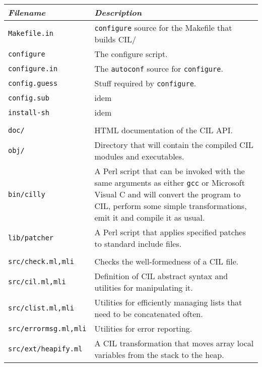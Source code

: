 \documentclass[letterpaper]{article}
\def\t#1{{\tt #1}}
\begin{document}
\begin{longtable}{lp{4in}}
\emph{Filename}   & \emph{Description} \\
\endhead
\endfoot
\t{Makefile.in}                 & \t{configure} source for the 
                                  Makefile that builds CIL/ \\
\t{configure}                   & The configure script. \\
\t{configure.in}                & The \t{autoconf} source for \t{configure}. \\
\t{config.guess} 		& Stuff required by \t{configure}. \\
\t{config.sub} 			& idem \\
\t{install-sh}	 		& idem \\
\\
\t{doc/}                        & HTML documentation of the CIL API. \\
\t{obj/}                        & Directory that will contain the compiled
                                   CIL modules and executables.\\
\t{bin/cilly}                &  A Perl script 
                                  that can be invoked with the 
                                  same arguments as either \t{gcc} or
                                  Microsoft Visual C and will convert the
                                  program to CIL, perform some simple
                                  transformations, emit it and compile it as
                                  usual. \\
\t{lib/patcher}              & A Perl script that applies specified patches
                                  to standard include files.\\
\\
\t{src/check.ml,mli}            & Checks the well-formedness of a CIL file. \\
\t{src/cil.ml,mli}              & Definition of CIL abstract syntax and
                                   utilities for manipulating it.\\
\t{src/clist.ml,mli}            & Utilities for efficiently managing lists
                                   that need to be concatenated often.\\
\t{src/errormsg.ml,mli}         & Utilities for error reporting. \\
\t{src/ext/heapify.ml}          & A CIL transformation that moves array local
                                   variables from the stack to the heap. \\

\end{longtable}
\end{document}
